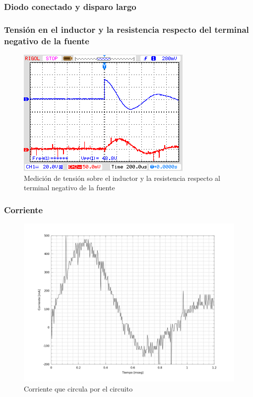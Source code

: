 \documentclass[a4paper,10pt]{article}
\begin{document}
\subsubsection{Diodo conectado y disparo largo}

\subsubsection*{Tensión en el inductor y la resistencia respecto del terminal negativo de la fuente}

\begin{figure}[H] %
\begin{center}
\includegraphics[scale=0.8]{./imagenes/tiristor_medicion3.png}
\caption{Medición de tensión sobre el inductor y la resistencia respecto al terminal negativo de la fuente}
 \label{fig:Med3_tiristor}
\end{center}
\end{figure}

\subsubsection*{Corriente}

\begin{figure}[H] %
\begin{center}
\includegraphics[scale=0.3]{./imagenes/Corriente3.png}
\caption{Corriente que circula por el circuito}
 \label{fig:Corriente3_tiristor}
\end{center}
\end{figure}
\end{document}
